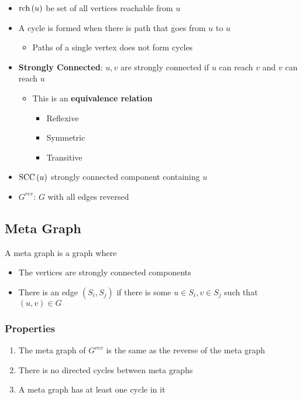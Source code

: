   \begin{itemize}
    \item $ \operatorname{rch}\left( u \right) $ be set of all vertices reachable from $ u $
    \item A cycle is formed when there is path that goes from $ u $ to $ u $
    \begin{itemize}
      \item Paths of a single vertex does not form cycles
    \end{itemize}

    \item \textbf{Strongly Connected}: $ u, v $ are strongly connected if
    $ u $ can reach $ v $ and $ v $ can reach $ u $
    \begin{itemize}
      \item This is an \textbf{equivalence relation}
      \begin{itemize}
        \item Reflexive
        \item Symmetric
        \item Transitive
      \end{itemize}
    \end{itemize}

    \item $ \operatorname{SCC}\left( u \right) $ strongly connected component containing
    $ u $
    \item $ G^{rev} $: $ G $ with all edges reversed
  \end{itemize}

  \subsection{Meta Graph}

    A meta graph is a graph where

    \begin{itemize}
      \item The vertices are strongly connected components
      \item There is an edge $ \left( S_{i}, S_{j} \right) $ if there is some
      $ u \in S_{i}, v \in S_{j} $ such that $ \left( u, v \right) \in G $
    \end{itemize}

    \subsubsection{Properties}

      \begin{enumerate}
        \item The meta graph of $ G^{rev} $ is the same as the reverse of
        the meta graph
        \item There is no directed cycles between meta graphs
        \item A meta graph has at least one cycle in it
      \end{enumerate}

